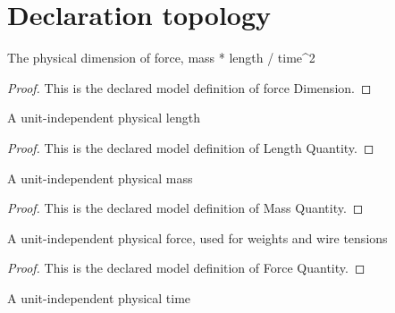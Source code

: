 \section{Declaration topology}
\begin{definition}
  \label{def:physics:phyx-mini-0172:phyxminiproblems-problemphyxmini0172-forcedimension}
  The physical dimension of force, mass * length / time\textasciicircum{}2
\end{definition}
\begin{proof}
  This is the declared model definition of force Dimension.
\end{proof}
\begin{definition}
  \label{def:physics:phyx-mini-0172:phyxminiproblems-problemphyxmini0172-lengthquantity}
  A unit-independent physical length
\end{definition}
\begin{proof}
  This is the declared model definition of Length Quantity.
\end{proof}
\begin{definition}
  \label{def:physics:phyx-mini-0172:phyxminiproblems-problemphyxmini0172-massquantity}
  A unit-independent physical mass
\end{definition}
\begin{proof}
  This is the declared model definition of Mass Quantity.
\end{proof}
\begin{definition}
  \label{def:physics:phyx-mini-0172:phyxminiproblems-problemphyxmini0172-forcequantity}
  A unit-independent physical force, used for weights and wire tensions
\end{definition}
\begin{proof}
  This is the declared model definition of Force Quantity.
\end{proof}
\begin{definition}
  \label{def:physics:phyx-mini-0172:phyxminiproblems-problemphyxmini0172-timequantity}
  A unit-independent physical time
\end{definition}
